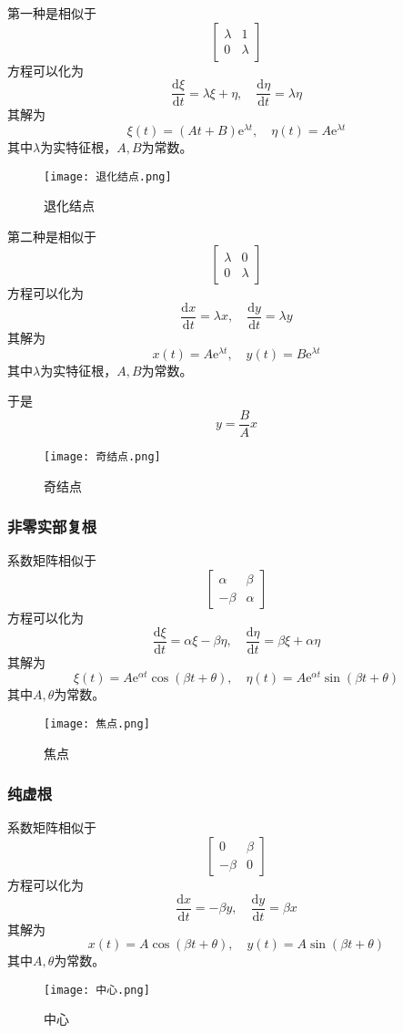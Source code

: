 第一种是相似于
\[\left[\begin{array}{ll}\lambda & 1 \\ 0 & \lambda\end{array}\right]\]
方程可以化为
\[\frac{\mathrm{d} \xi}{\mathrm{d} t}=\lambda \xi+\eta, \quad \frac{\mathrm{d} \eta}{\mathrm{d} t}=\lambda \eta\]
其解为
\[
    \xi(t)=(At+B)\mathrm{e}^{\lambda t},\quad \eta(t)=A\mathrm{e}^{\lambda t}
\]
其中$\lambda$为实特征根，$A,B$为常数。
\begin{figure}[h]
    \centering
    \texttt{[image: 退化结点.png]}
    \caption{退化结点}
    \label{fig:退化结点}
\end{figure}

第二种是相似于
\[\left[\begin{array}{ll}\lambda & 0 \\ 0 & \lambda\end{array}\right]\]
方程可以化为
\[\frac{\mathrm{d} x}{\mathrm{d} t}=\lambda x, \quad \frac{\mathrm{d} y}{\mathrm{d} t}=\lambda y\]
其解为
\[
    x(t)=A\mathrm{e}^{\lambda t},\quad y(t)=B\mathrm{e}^{\lambda t}
\]
其中$\lambda$为实特征根，$A,B$为常数。

于是
\[y=\frac{B}{A}x\]
\begin{figure}[h]
    \centering
    \texttt{[image: 奇结点.png]}
    \caption{奇结点}
    \label{fig:奇结点}
\end{figure}

\subsubsection{非零实部复根}
系数矩阵相似于
\[\left[\begin{array}{rr}\alpha & \beta \\ -\beta & \alpha\end{array}\right]\]
方程可以化为
\[\frac{\mathrm{d} \xi}{\mathrm{d} t}=\alpha \xi-\beta \eta, \quad \frac{\mathrm{d} \eta}{\mathrm{d} t}=\beta \xi+\alpha \eta\]
其解为
\[
    \xi(t)=A\mathrm{e}^{\alpha t}\cos(\beta t+\theta), \quad \eta(t)=A\mathrm{e}^{\alpha t}\sin(\beta t+\theta)
\]
其中$A,\theta$为常数。
\begin{figure}[h]
    \centering
    \texttt{[image: 焦点.png]}
    \caption{焦点}
    \label{fig:焦点}
\end{figure}

\subsubsection{纯虚根}
系数矩阵相似于
\[\left[\begin{array}{rr}0 & \beta \\ -\beta & 0\end{array}\right]\]
方程可以化为
\[\frac{\mathrm{d} x}{\mathrm{d} t}=-\beta y, \quad \frac{\mathrm{d} y}{\mathrm{d} t}=\beta x\]
其解为
\[
    x(t)=A\cos(\beta t+\theta), \quad y(t)=A\sin(\beta t+\theta)
\]
其中$A,\theta$为常数。
\begin{figure}[h]
    \centering
    \texttt{[image: 中心.png]}
    \caption{中心}
    \label{fig:中心}
\end{figure}

